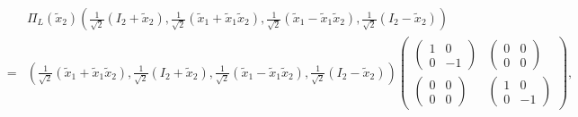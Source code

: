 \documentclass[aps,preprint]{revtex4}
\begin{document}
\begin{eqnarray}
&&\Pi _{L}\left( \widetilde{x}_{2}\right) \left( \frac{1}{\sqrt{2}}\left(
I_{2}+\widetilde{x}_{2}\right) ,\frac{1}{\sqrt{2}}\left( \widetilde{x}_{1}+%
\widetilde{x}_{1}\widetilde{x}_{2}\right) ,\frac{1}{\sqrt{2}}\left( 
\widetilde{x}_{1}-\widetilde{x}_{1}\widetilde{x}_{2}\right) ,\frac{1}{\sqrt{2%
}}\left( I_{2}-\widetilde{x}_{2}\right) \right) \\
&=&\left( \frac{1}{\sqrt{2}}\left( \widetilde{x}_{1}+\widetilde{x}_{1}%
\widetilde{x}_{2}\right) ,\frac{1}{\sqrt{2}}\left( I_{2}+\widetilde{x}%
_{2}\right) ,\frac{1}{\sqrt{2}}\left( \widetilde{x}_{1}-\widetilde{x}_{1}%
\widetilde{x}_{2}\right) ,\frac{1}{\sqrt{2}}\left( I_{2}-\widetilde{x}%
_{2}\right) \right) \left( 
\begin{array}{cc}
\left( 
\begin{array}{cc}
1 & 0 \\ 
0 & -1%
\end{array}%
\right) & \left( 
\begin{array}{cc}
0 & 0 \\ 
0 & 0%
\end{array}%
\right) \\ 
\left( 
\begin{array}{cc}
0 & 0 \\ 
0 & 0%
\end{array}%
\right) & \left( 
\begin{array}{cc}
1 & 0 \\ 
0 & -1%
\end{array}%
\right)%
\end{array}%
\right) ,
\end{eqnarray}%
\end{document}
